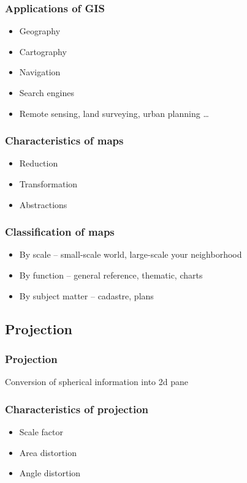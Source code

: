 \documentclass{beamer}
\begin{document}
\begin{frame}
  \frametitle{Applications of GIS}
  \begin{itemize}
  \item Geography
  \item Cartography
  \item Navigation
  \item Search engines
  \item Remote sensing, land surveying, urban planning \ldots{}
  \end{itemize}
\end{frame}

\begin{frame}
  \frametitle{Characteristics of maps}
  \begin{itemize}
  \item<1-> Reduction 
  \item<3-> Transformation 
  \item<5-> Abstractions 
  \end{itemize}
\end{frame}

\begin{frame}
  \frametitle{Classification of maps}
  \begin{itemize}
  \item By scale -- small-scale world, large-scale your neighborhood
  \item By function -- general reference, thematic, charts
  \item By subject matter -- cadastre, plans
  \end{itemize}
\end{frame}


\subsection{Projection}

\begin{frame}
  \frametitle{Projection}
  Conversion of spherical information into 2d pane
\end{frame}

\begin{frame}
  \frametitle{Characteristics of projection}
  \begin{itemize}
  \item Scale factor
  \item Area distortion
  \item Angle distortion
  \end{itemize}
\end{frame}
\end{document}

